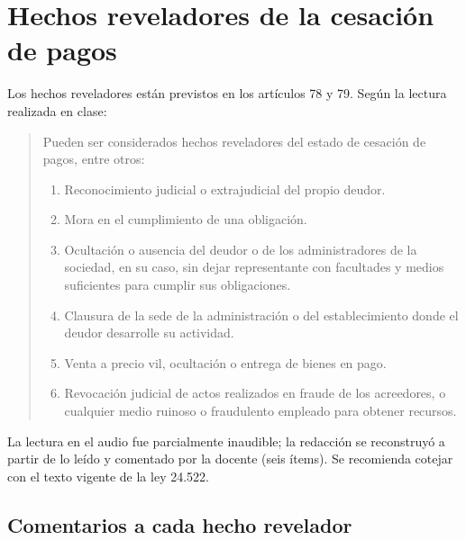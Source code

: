 \documentclass[12pt,oneside]{book}
\begin{document}
\section{Hechos reveladores de la cesación de pagos}

Los hechos reveladores están previstos en los artículos 78 y 79. Según la lectura realizada en clase:

\begin{quote}
Pueden ser considerados hechos reveladores del estado de cesación de pagos, entre otros:
\begin{enumerate}
    \item Reconocimiento judicial o extrajudicial del propio deudor.
    \item Mora en el cumplimiento de una obligación.
    \item Ocultación o ausencia del deudor o de los administradores de la sociedad, en su caso, sin dejar representante con facultades y medios suficientes para cumplir sus obligaciones.
    \item Clausura de la sede de la administración o del establecimiento donde el deudor desarrolle su actividad.
    \item Venta a precio vil, ocultación o entrega de bienes en pago.
    \item Revocación judicial de actos realizados en fraude de los acreedores, o cualquier medio ruinoso o fraudulento empleado para obtener recursos.
\end{enumerate}
\end{quote}

\begin{note}
La lectura en el audio fue parcialmente inaudible; la redacción se reconstruyó a partir de lo leído y comentado por la docente (seis ítems). Se recomienda cotejar con el texto vigente de la ley 24.522.
\end{note}

\subsection{Comentarios a cada hecho revelador}
\end{document}
